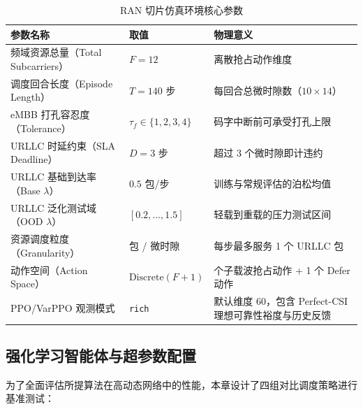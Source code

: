 \begin{longtable}[]{@{}>{\raggedright\arraybackslash}p{}>{\raggedright\arraybackslash}p{}>{\raggedright\arraybackslash}p{}@{}}
\caption{RAN 切片仿真环境核心参数}\label{tab:sim_core_params}\\
\toprule\noalign{}
参数名称 & 取值 & 物理意义 \\
\midrule\noalign{}
\endhead
\bottomrule\noalign{}
\endlastfoot
频域资源总量（Total Subcarriers） & \(F = 12\) & 离散抢占动作维度 \\
调度回合长度（Episode Length） & \(T = 140\) 步 & 每回合总微时隙数（\(10 \times 14\)） \\
eMBB 打孔容忍度（Tolerance） & \(\tau_f \in \{1,2,3,4\}\) & 码字中断前可承受打孔上限 \\
URLLC 时延约束（SLA Deadline） & \(D = 3\) 步 & 超过 3 个微时隙即计违约 \\
URLLC 基础到达率（Base \(\lambda\)） & \(0.5\) 包/步 & 训练与常规评估的泊松均值 \\
URLLC 泛化测试域（OOD \(\lambda\)） & \([0.2, \dots, 1.5]\) & 轻载到重载的压力测试区间 \\
资源调度粒度（Granularity） & 1 包 / 微时隙 & 每步最多服务 1 个 URLLC 包 \\
动作空间（Action Space） & \(\mathrm{Discrete}(F+1)\) & 12 个子载波抢占动作 + 1 个 Defer 动作 \\
PPO/VarPPO 观测模式 & \texttt{rich} & 默认维度 60，包含 Perfect-CSI 理想可靠性裕度与历史反馈 \\
\end{longtable}

\subsection{强化学习智能体与超参数配置}\label{412-ux5f3aux5316ux5b66ux4e60ux667aux80fdux4f53ux4e0eux8d85ux53c2ux6570ux914dux7f6e}

为了全面评估所提算法在高动态网络中的性能，本章设计了四组对比调度策略进行基准测试：

